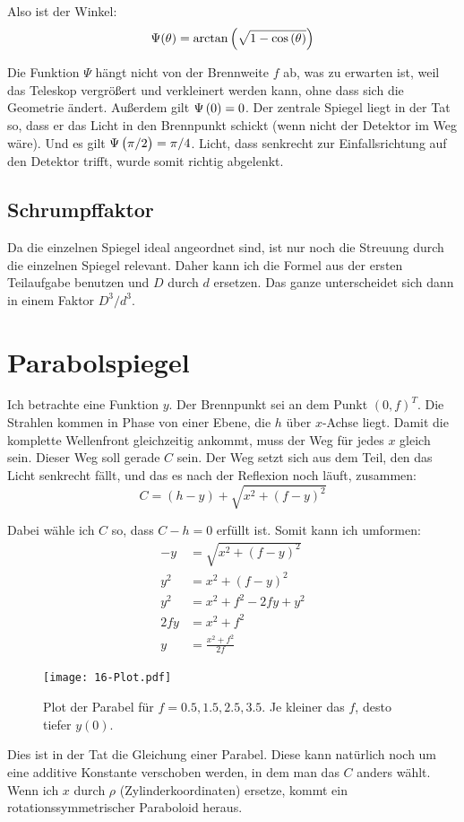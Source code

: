 \documentclass[11pt, ngerman, fleqn]{article}
\begin{document}
Also ist der Winkel:
\[
	\Psi(\theta) = \arctan\del{\sqrt{1 - \cos\del\theta}}
\]

Die Funktion $\Psi$ hängt nicht von der Brennweite $f$ ab, was zu erwarten ist,
weil das Teleskop vergrößert und verkleinert werden kann, ohne dass sich die
Geometrie ändert. Außerdem gilt $\Psi\del 0 = 0$. Der zentrale Spiegel liegt in
der Tat so, dass er das Licht in den Brennpunkt schickt (wenn nicht der
Detektor im Weg wäre). Und es gilt $\Psi\del{\pi/2} = \pi/4$. Licht, dass
senkrecht zur Einfallsrichtung auf den Detektor trifft, wurde somit richtig
abgelenkt.

\subsection{Schrumpffaktor}

Da die einzelnen Spiegel ideal angeordnet sind, ist nur noch die Streuung durch
die einzelnen Spiegel relevant. Daher kann ich die Formel aus der ersten
Teilaufgabe benutzen und $D$ durch $d$ ersetzen. Das ganze unterscheidet sich
dann in einem Faktor $D^3/d^3$.


\section{Parabolspiegel}
\label{4}

Ich betrachte eine Funktion $y$. Der Brennpunkt sei an dem Punkt $(0, f)^T$.
Die Strahlen kommen in Phase von einer Ebene, die $h$ über $x$-Achse liegt.
Damit die komplette Wellenfront gleichzeitig ankommt, muss der Weg für jedes
$x$ gleich sein. Dieser Weg soll gerade $C$ sein. Der Weg setzt sich aus dem
Teil, den das Licht senkrecht fällt, und das es nach der Reflexion noch läuft,
zusammen:
\[
	C = (h-y) + \sqrt{x^2 + (f-y)^2}
\]

Dabei wähle ich $C$ so, dass $C - h=0$ erfüllt ist. Somit kann ich umformen:
\begin{align*}
	-y &= \sqrt{x^2 + (f-y)^2} \\
	y^2 &= x^2 + (f-y)^2 \\
	y^2 &= x^2 + f^2 - 2fy + y^2 \\
	2fy &= x^2 + f^2 \\
	  y &= \frac{x^2 + f^2}{2f}
\end{align*}

\begin{figure}
	\centering
	\texttt{[image: 16-Plot.pdf]}
	\caption{Plot der Parabel für $f = 0.5, 1.5, 2.5, 3.5$. Je kleiner das $f$, desto tiefer $y(0)$.}
	\label{fig:}
\end{figure}

Dies ist in der Tat die Gleichung einer Parabel. Diese kann natürlich noch um
eine additive Konstante verschoben werden, in dem man das $C$ anders wählt.
Wenn ich $x$ durch $\rho$ (Zylinderkoordinaten) ersetze, kommt
ein rotationssymmetrischer Paraboloid heraus.

%
%
\end{document}
